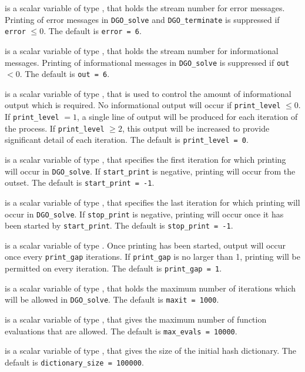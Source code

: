 \documentclass{galahad}
\newcommand{\packagename}{DGO}
\begin{document}
\begin{description}

 is a scalar variable of type \integer, that holds the
stream number for error messages. Printing of error messages in
{\tt \packagename\_solve} and {\tt \packagename\_terminate}
is suppressed if {\tt error} $\leq 0$.
The default is {\tt error = 6}.

 is a scalar variable of type \integer, that holds the
stream number for informational messages. Printing of informational messages in
{\tt \packagename\_solve} is suppressed if {\tt out} $< 0$.
The default is {\tt out = 6}.

 is a scalar variable of type \integer, that is used
to control the amount of informational output which is required. No
informational output will occur if {\tt print\_level} $\leq 0$. If
{\tt print\_level} $= 1$, a single line of output will be produced for each
iteration of the process. If {\tt print\_level} $\geq 2$, this output will be
increased to provide significant detail of each iteration.
The default is {\tt print\_level = 0}.

 is a scalar variable of type \integer, that specifies
the first iteration for which printing will occur in {\tt \packagename\_solve}.
If {\tt start\_print} is negative, printing will occur from the outset.
The default is {\tt start\_print = -1}.

 is a scalar variable of type \integer, that specifies
the last iteration for which printing will occur in  {\tt \packagename\_solve}.
If {\tt stop\_print} is negative, printing will occur once it has been
started by {\tt start\_print}.
The default is {\tt stop\_print = -1}.

 is a scalar variable of type \integer.
Once printing has been started, output will occur once every
{\tt print\_gap} iterations. If {\tt print\_gap} is no larger than 1,
printing will be permitted on every iteration.
The default is {\tt print\_gap = 1}.

 is a scalar variable of type \integer, that holds the
maximum number of iterations which will be allowed in {\tt \packagename\_solve}.
The default is {\tt maxit = 1000}.

 is a scalar variable of type \integer, that gives
the maximum number of function evaluations that are allowed.
The default is {\tt max\_evals = 10000}.

 is a scalar variable of type \integer, that 
gives the size of the initial hash dictionary.
The default is {\tt dictionary\_size = 100000}.


\end{description}
\end{document}
